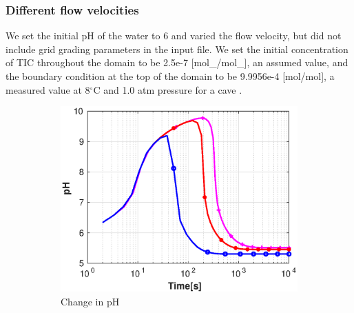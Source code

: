 \subsubsection*{Different flow velocities}\label{ssec:diffFlowVel}
We set the initial pH of the water to 6 and varied the flow velocity, but did not include grid grading parameters in the input file. 
We set the initial concentration of TIC throughout the domain to be 2.5e-7 [mol\_/mol\_], an assumed value, and the boundary condition at the 
top of the domain to be 9.9956e-4 [mol/mol], a measured value at 8$^{\circ}$C and 1.0 atm pressure for a cave \cite{Class2020}. \\

\begin{figure}[!h]
        \centering
    \begin{subfigure}{.5\linewidth}
        \centering
        \includegraphics[width=\textwidth]{PICTURES/with_vel_pH.eps}
        \caption{Change in pH}
        \label{fig:velpH}       %
    \end{subfigure}%
        \hfill
    \begin{subfigure}{.5\linewidth}
        \centering

\end{subfigure}
\end{figure}
